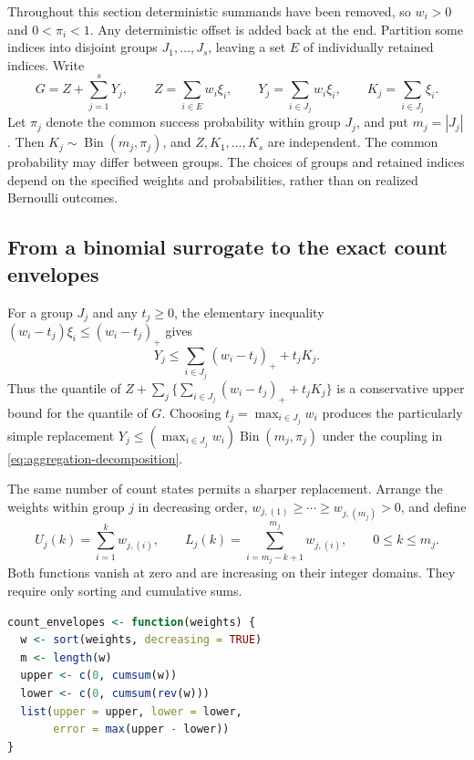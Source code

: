 \documentclass[11pt,letterpaper]{article}
\numberwithin{equation}{section}
\theoremstyle{definition}
\theoremstyle{remark}
\begin{document}
Throughout this section deterministic summands have been removed, so
$w_i>0$ and $0<\pi_i<1$. Any deterministic offset is added back at the end.
Partition some indices into disjoint groups $J_1,\ldots,J_s$, leaving a
set $E$ of individually retained indices. Write
\begin{equation}
 G=Z+\sum_{j=1}^s Y_j,\qquad
 Z=\sum_{i\in E}w_i\xi_i,\qquad
 Y_j=\sum_{i\in J_j}w_i\xi_i,\qquad
 K_j=\sum_{i\in J_j}\xi_i.
 \label{eq:aggregation-decomposition}
\end{equation}
Let $\pi_j$ denote the common success probability within group $J_j$, and put
$m_j=|J_j|$. Then $K_j\sim\operatorname{Bin}(m_j,\pi_j)$, and
$Z,K_1,\ldots,K_s$ are independent. The common probability may differ
between groups. The choices of groups and retained indices depend on the
specified weights and probabilities, rather than on realized Bernoulli
outcomes.

\subsection{From a binomial surrogate to the exact count envelopes}

For a group $J_j$ and any $t_j\ge0$, the elementary inequality
$(w_i-t_j)\xi_i\le(w_i-t_j)_+$ gives
\begin{equation}
 Y_j\le \sum_{i\in J_j}(w_i-t_j)_++t_jK_j.
 \label{eq:aggregation-affine}
\end{equation}
Thus the quantile of
$Z+\sum_j\{\sum_{i\in J_j}(w_i-t_j)_++t_jK_j\}$ is a conservative
upper bound for the quantile of $G$. Choosing $t_j=\max_{i\in J_j}w_i$
produces the particularly simple replacement
$Y_j\le (\max_{i\in J_j}w_i)\operatorname{Bin}(m_j,\pi_j)$ under the
coupling in \eqref{eq:aggregation-decomposition}.

The same number of count states permits a sharper replacement. Arrange the
weights within group $j$ in decreasing order,
$w_{j,(1)}\ge\cdots\ge w_{j,(m_j)}>0$, and define
\begin{equation}
 U_j(k)=\sum_{i=1}^k w_{j,(i)},\qquad
 L_j(k)=\sum_{i=m_j-k+1}^{m_j}w_{j,(i)},\qquad 0\le k\le m_j.
 \label{eq:aggregation-prefix}
\end{equation}
Both functions vanish at zero and are increasing on their integer domains.
They require only sorting and cumulative sums.


\begin{minipage}{\linewidth}
\begin{lstlisting}[language=R]
count_envelopes <- function(weights) {
  w <- sort(weights, decreasing = TRUE)
  m <- length(w)
  upper <- c(0, cumsum(w))
  lower <- c(0, cumsum(rev(w)))
  list(upper = upper, lower = lower,
       error = max(upper - lower))
}
\end{lstlisting}
\end{minipage}
\end{document}
